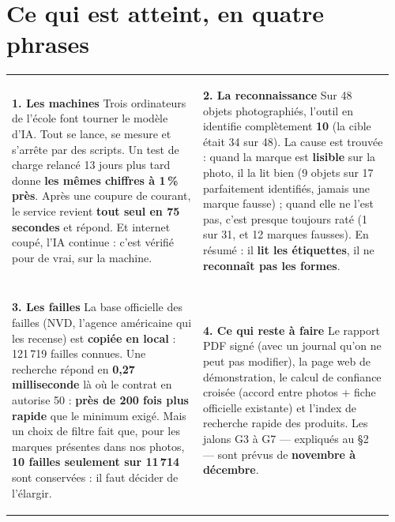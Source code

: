 \documentclass[10pt,a4paper]{article}
\renewcommand{\arraystretch}{1.08}
\begin{document}
\section{Ce qui est atteint, en quatre phrases}
\begin{center}
\renewcommand{\arraystretch}{1.0}
\begin{tabular}{@{}p{0.48\linewidth}p{0.48\linewidth}@{}}
\begin{tcolorbox}[enhanced,colback=ok!5,colframe=ok!60,boxrule=0.5pt,arc=2pt,
  left=5pt,right=5pt,top=4pt,bottom=4pt]
{\sffamily\bfseries\color{ok}1. Les machines} {\footnotesize\sffamily Trois ordinateurs de
l'école font tourner le modèle d'IA. Tout se lance, se mesure et s'arrête par des scripts. Un test
de charge relancé 13 jours plus tard donne \textbf{les mêmes chiffres à 1\,\% près}. Après une
coupure de courant, le service revient \textbf{tout seul en 75 secondes} et répond. Et internet
coupé, l'IA continue : c'est vérifié pour de vrai, sur la machine.}
\end{tcolorbox}&
\begin{tcolorbox}[enhanced,colback=warn!5,colframe=warn!60,boxrule=0.5pt,arc=2pt,
  left=5pt,right=5pt,top=4pt,bottom=4pt]
{\sffamily\bfseries\color{warn}2. La reconnaissance} {\footnotesize\sffamily Sur 48 objets
photographiés, l'outil en identifie complètement \textbf{10} (la cible était 34 sur 48). La cause
est trouvée : quand la marque est \textbf{lisible} sur la photo, il la lit bien (9 objets sur 17
parfaitement identifiés, jamais une marque fausse) ; quand elle ne l'est pas, c'est presque
toujours raté (1 sur 31, et 12 marques fausses). En résumé : il \textbf{lit les étiquettes}, il ne
\textbf{reconnaît pas les formes}.}
\end{tcolorbox}\\[1.5mm]
\begin{tcolorbox}[enhanced,colback=ok!5,colframe=ok!60,boxrule=0.5pt,arc=2pt,
  left=5pt,right=5pt,top=4pt,bottom=4pt]
{\sffamily\bfseries\color{ok}3. Les failles} {\footnotesize\sffamily La base officielle des
failles (NVD, l'agence américaine qui les recense) est \textbf{copiée en local} : 121\,719 failles
connues. Une recherche répond en \textbf{0,27 milliseconde} là où le contrat en autorise 50 :
\textbf{près de 200 fois plus rapide} que le minimum exigé. Mais un choix de filtre fait que, pour
les marques présentes dans nos photos, \textbf{10 failles seulement sur 11\,714} sont conservées :
il faut décider de l'élargir.}
\end{tcolorbox}&
\begin{tcolorbox}[enhanced,colback=todo!5,colframe=todo!60,boxrule=0.5pt,arc=2pt,
  left=5pt,right=5pt,top=4pt,bottom=4pt]
{\sffamily\bfseries\color{todo}4. Ce qui reste à faire} {\footnotesize\sffamily Le rapport PDF
signé (avec un journal qu'on ne peut pas modifier), la page web de démonstration, le calcul de
confiance croisée (accord entre photos + fiche officielle existante) et l'index de recherche rapide
des produits. Les jalons G3 à G7 — expliqués au §2 — sont prévus de \textbf{novembre à décembre}.}
\end{tcolorbox}
\end{tabular}
\end{center}
\end{document}

